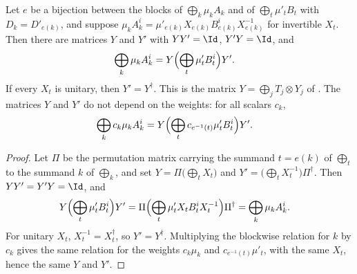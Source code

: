\begin{lemma}
    \label{thm:periodic_matched_blocks_global_similarity}
    \leanok
    Let $e$ be a bijection between the blocks of $\bigoplus_k\mu_kA_k$ and of
    $\bigoplus_t\mu'_tB_t$ with $D_k=D'_{e(k)}$, and suppose
    $\mu_kA_k^i=\mu'_{e(k)}X_{e(k)}B_{e(k)}^iX_{e(k)}^{-1}$ for invertible
    $X_t$. Then there are matrices $Y$ and $Y'$ with $YY'=\Id$, $Y'Y=\Id$, and
    \begin{align}
        \bigoplus_k\mu_kA_k^i & =Y\Bigl(\bigoplus_t\mu'_tB_t^i\Bigr)Y'. \notag
    \end{align}
    If every $X_t$ is unitary, then $Y'=Y^\dagger$. This is the matrix
    $Y=\bigoplus_jT_j\otimes Y_j$ of
    \cite[line~690]{DeLasCuevas2017Irreducible}. The matrices $Y$ and $Y'$
    do not depend on the weights: for all scalars $c_k$,
    \begin{align}
        \bigoplus_kc_k\mu_kA_k^i & =Y\Bigl(\bigoplus_tc_{e^{-1}(t)}\mu'_tB_t^i\Bigr)Y'. \notag
    \end{align}
\end{lemma}

\begin{proof}
    \leanok
    Let $\Pi$ be the permutation matrix carrying the summand $t=e(k)$ of
    $\bigoplus_t$ to the summand $k$ of $\bigoplus_k$, and set
    $Y=\Pi\bigl(\bigoplus_tX_t\bigr)$ and
    $Y'=\bigl(\bigoplus_tX_t^{-1}\bigr)\Pi^\dagger$. Then $YY'=Y'Y=\Id$, and
    \begin{align}
        Y\Bigl(\bigoplus_t\mu'_tB_t^i\Bigr)Y'
         & =\Pi\Bigl(\bigoplus_t\mu'_tX_tB_t^iX_t^{-1}\Bigr)\Pi^\dagger
        =\bigoplus_k\mu_kA_k^i. \notag
    \end{align}
    For unitary $X_t$, $X_t^{-1}=X_t^\dagger$, so $Y'=Y^\dagger$.
    Multiplying the blockwise relation for $k$ by $c_k$ gives the same
    relation for the weights $c_k\mu_k$ and $c_{e^{-1}(t)}\mu'_t$, with the
    same $X_t$, hence the same $Y$ and $Y'$.
\end{proof}

